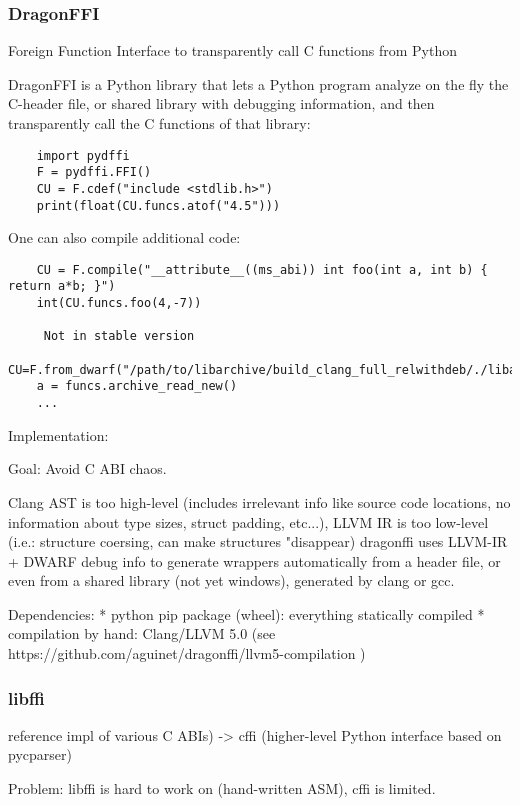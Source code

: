 \subsubsection{DragonFFI}

Foreign Function Interface to transparently call C functions from Python

DragonFFI is a Python library that lets a Python program analyze on the fly the C-header file, or shared library with debugging information,
and then transparently call the C functions of that library:

\begin{lstlisting}
    import pydffi
    F = pydffi.FFI()
    CU = F.cdef("include <stdlib.h>")
    print(float(CU.funcs.atof("4.5")))
\end{lstlisting}

One can also compile additional code:

\begin{lstlisting}
    CU = F.compile("__attribute__((ms_abi)) int foo(int a, int b) { return a*b; }")
    int(CU.funcs.foo(4,-7))

     Not in stable version
    CU=F.from_dwarf("/path/to/libarchive/build_clang_full_relwithdeb/./libarchive/libarchive.so")
    a = funcs.archive_read_new()
    ...
\end{lstlisting}

Implementation:

Goal: Avoid C ABI chaos.

Clang AST is too high-level (includes irrelevant info like source code locations, no information about type sizes, struct padding, etc...), LLVM IR is too low-level (i.e.: structure coersing, can make structures "disappear) 
dragonffi uses LLVM-IR + DWARF debug info to generate wrappers automatically from a header file, or even from
a shared library (not yet windows), generated by clang or gcc.

Dependencies:
    * python pip package (wheel): everything statically compiled
    * compilation by hand: Clang/LLVM 5.0 (see https://github.com/aguinet/dragonffi/llvm5-compilation )

\subsubsection{libffi}

reference impl of various C ABIs) -> cffi (higher-level Python interface based on pycparser)

Problem: libffi is hard to work on (hand-written ASM), cffi is limited.


